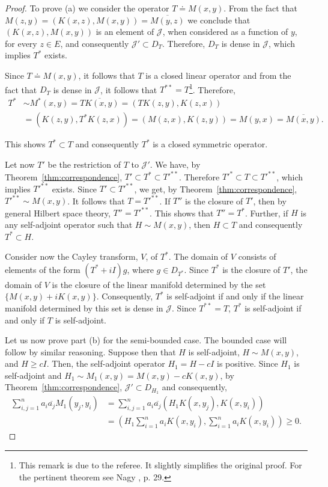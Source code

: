 \documentclass{article}
\begin{document}
\begin{proof}
To prove (a) we consider the operator $T \doteq M(x, y)$. From the fact that $M(z,y) = (K(x, z), M(x, y)) = \overline{M(y, z)}$ we conclude that $(K(x, z), M(x, y))$ is an element of $\mathcal{J}$, when considered as a function of $y$, for every $z \in E$, and consequently $\mathcal{J}' \subset D_T$. Therefore, $D_T$ is dense in $\mathcal{J}$, which implies $T^*$ exists.

Since $T \doteq M(x, y)$, it follows that $T$ is a closed linear operator and from the fact that $D_T$ is dense in $\mathcal{J}$, it follows that $T^{**} = T$\footnote{This remark is due to the referee. It slightly simplifies the original proof. For the pertinent theorem see Nagy \cite{nagy}, p. 29.}. Therefore,
\begin{align}
T^* &\sim M^*(x, y) = \overline{TK(x,y)} = (TK(z, y), K(z, x)) \nonumber \\
&= (K(z, y), T^*K(z, x)) = (M(z, x), K(z, y)) = M(y, x) = \overline{M(x, y)}.
\label{eq:adjoint-correspondence}
\end{align}

This shows $T^* \subset T$ and consequently $T^*$ is a closed symmetric operator.

Let now $T'$ be the restriction of $T$ to $\mathcal{J}'$. We have, by Theorem~\ref{thm:correspondence}, $T' \subset T^* \subset T'^{**}$. Therefore $T'^* \subset T \subset T'^{**}$, which implies $T'^{**}$ exists. Since $T' \subset T'^{**}$, we get, by Theorem~\ref{thm:correspondence}, $T'^{**} \sim M(x, y)$. It follows that $T = T'^{**}$. If $T''$ is the closure of $T'$, then by general Hilbert space theory, $T'' = T'^{**}$. This shows that $T'' = T^*$. Further, if $H$ is any self-adjoint operator such that $H \sim M(x, y)$, then $H \subset T$ and consequently $T^* \subset H$.

Consider now the Cayley transform, $V$, of $T^*$. The domain of $V$ consists of elements of the form $(T^* + iI)g$, where $g \in D_{T^*}$. Since $T^*$ is the closure of $T'$, the domain of $V$ is the closure of the linear manifold determined by the set $\{M(x, y) + iK(x, y)\}$. Consequently, $T^*$ is self-adjoint if and only if the linear manifold determined by this set is dense in $\mathcal{J}$. Since $T^{**} = T$, $T^*$ is self-adjoint if and only if $T$ is self-adjoint.

Let us now prove part (b) for the semi-bounded case. The bounded case will follow by similar reasoning. Suppose then that $H$ is self-adjoint, $H \sim M(x, y)$, and $H \geq cI$. Then, the self-adjoint operator $H_1 = H - cI$ is positive. Since $H_1$ is self-adjoint and $H_1 \sim M_1(x, y) = M(x, y) - cK(x, y)$, by Theorem~\ref{thm:correspondence}, $\mathcal{J}' \subset D_{H_1}$ and consequently,
\begin{align}
\sum_{i,j=1}^n a_i \overline{a_j} M_1(y_j, y_i) &= \sum_{i,j=1}^n a_i \overline{a_j} (H_1K(x, y_j), K(x, y_i)) \nonumber \\
&= \left(H_1\sum_{i=1}^n a_i K(x, y_i), \sum_{i=1}^n a_i K(x, y_i)\right) \geq 0.
\label{eq:positivity}
\end{align}


\end{proof}
\end{document}

